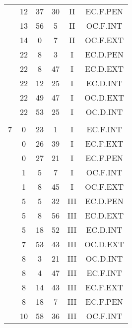 \documentclass[12pt, a4paper]{article}
\begin{document}
\begin{multicols}{3}
{\begin{tabular}{c c c c c c}
	 	 	 	 & 12 & 37 & 30 & II & EC.F.PEN\\%
	 	 	 	 & 13 & 56 & 5 & II & OC.F.INT\\%
	 	 	 	 & 14 & 0 & 7 & II & OC.F.EXT\\%
	 	 	 	 & 22 & 8 & 3 & I & EC.D.PEN\\%
	 	 	 	 & 22 & 8 & 47 & I & EC.D.EXT\\%
	 	 	 	 & 22 & 12 & 25 & I & EC.D.INT\\%
	 	 	 	 & 22 & 49 & 47 & I & OC.D.EXT\\%
	 	 	 	 & 22 & 53 & 25 & I & OC.D.INT\\%
	 	 	 	 & & & & & \\%
	 	 	 	7 & 0 & 23 & 1 & I & EC.F.INT\\%
	 	 	 	 & 0 & 26 & 39 & I & EC.F.EXT\\%
	 	 	 	 & 0 & 27 & 21 & I & EC.F.PEN\\%
	 	 	 	 & 1 & 5 & 7 & I & OC.F.INT\\%
	 	 	 	 & 1 & 8 & 45 & I & OC.F.EXT\\%
	 	 	 	 & 5 & 5 & 32 & III & EC.D.PEN\\%
	 	 	 	 & 5 & 8 & 56 & III & EC.D.EXT\\%
	 	 	 	 & 5 & 18 & 52 & III & EC.D.INT\\%
	 	 	 	 & 7 & 53 & 43 & III & OC.D.EXT\\%
	 	 	 	 & 8 & 3 & 21 & III & OC.D.INT\\%
	 	 	 	 & 8 & 4 & 47 & III & EC.F.INT\\%
	 	 	 	 & 8 & 14 & 43 & III & EC.F.EXT\\%
	 	 	 	 & 8 & 18 & 7 & III & EC.F.PEN\\%
	 	 	 	 & 10 & 58 & 36 & III & OC.F.INT\\%

\end{tabular}}
\end{multicols}
\end{document}
